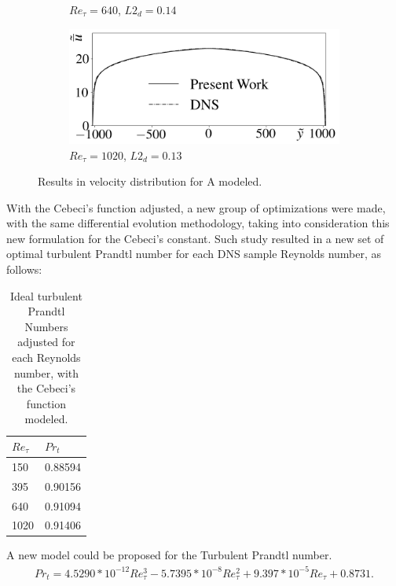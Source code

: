 \documentclass[10pt]{article} %
\begin{document}
\begin{figure}[!h]
\begin{subfigure}[t]{0.5\textwidth}
		\caption{$Re_\tau = 640$, $L2_d = 0.14$}
	\end{subfigure}
	\begin{subfigure}[t]{0.45\textwidth}
		\centering
		\includegraphics[angle=0, scale=0.24]{fotos_formatacao_final/Temperature_1000_Amodeled}
		\caption{$Re_\tau = 1020$, $L2_d = 0.13$}
	\end{subfigure}	
	\caption{Results in velocity distribution for A modeled.}
\end{figure}

With the Cebeci's function adjusted, a new group of optimizations were made, with the same differential evolution methodology, taking into consideration this new formulation for the Cebeci's constant. Such study resulted in a new set of optimal turbulent Prandtl number for each DNS sample Reynolds number, as follows:


\begin{table}[!h]
	\centering
	\caption{Ideal turbulent Prandtl Numbers adjusted for each Reynolds number, with the Cebeci's function modeled. }
	\begin{tabular}{ll}
		\hline
		$Re_\tau$ & $Pr_t$\\
		\hline
		150  &   0.88594\\
		395  &   0.90156\\
		640  &   0.91094\\
		1020 &   0.91406\\ 
		\hline
	\end{tabular}
\end{table}

A new model could be proposed for the Turbulent Prandtl number.
	\vspace{-2mm}
\begin{equation}
\begin{split}
Pr_t = 4.5290 * 10^{-12} Re_\tau^3 - 5.7395 * 10^{-8} Re_\tau^2 + 9.397 * 10^{-5} Re_\tau + 0.8731.
\end{split}
\end{equation}
\end{document}
